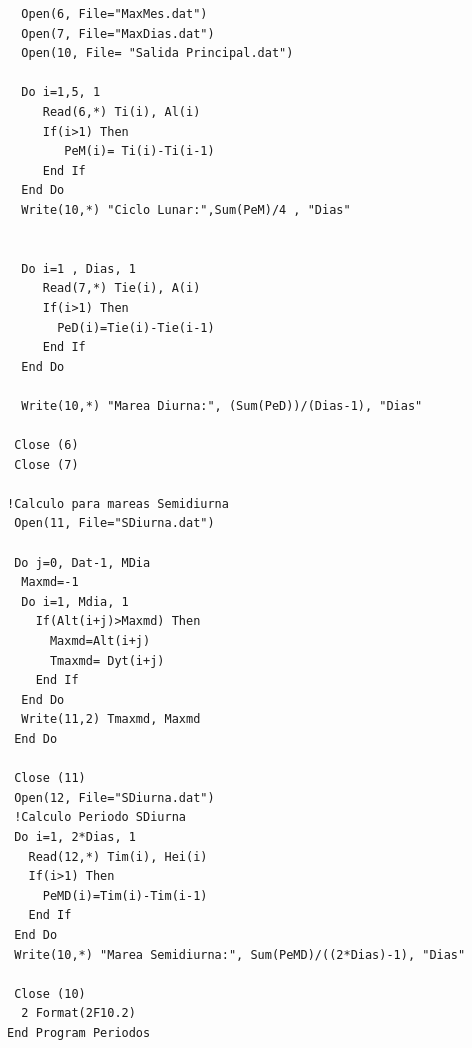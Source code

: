 \documentclass[12pt]{article}
\begin{document}
\begin{verbatim}
  Open(6, File="MaxMes.dat")
  Open(7, File="MaxDias.dat")
  Open(10, File= "Salida Principal.dat")
  
  Do i=1,5, 1 
     Read(6,*) Ti(i), Al(i)
     If(i>1) Then
        PeM(i)= Ti(i)-Ti(i-1)	
     End If
  End Do
  Write(10,*) "Ciclo Lunar:",Sum(PeM)/4 , "Dias"


  Do i=1 , Dias, 1
     Read(7,*) Tie(i), A(i)
     If(i>1) Then
       PeD(i)=Tie(i)-Tie(i-1)
     End If
  End Do

  Write(10,*) "Marea Diurna:", (Sum(PeD))/(Dias-1), "Dias"

 Close (6)
 Close (7)

!Calculo para mareas Semidiurna
 Open(11, File="SDiurna.dat")
  
 Do j=0, Dat-1, MDia
  Maxmd=-1
  Do i=1, Mdia, 1
    If(Alt(i+j)>Maxmd) Then
      Maxmd=Alt(i+j)
      Tmaxmd= Dyt(i+j)
    End If
  End Do
  Write(11,2) Tmaxmd, Maxmd
 End Do

 Close (11)
 Open(12, File="SDiurna.dat")
 !Calculo Periodo SDiurna
 Do i=1, 2*Dias, 1
   Read(12,*) Tim(i), Hei(i)
   If(i>1) Then
     PeMD(i)=Tim(i)-Tim(i-1)
   End If
 End Do
 Write(10,*) "Marea Semidiurna:", Sum(PeMD)/((2*Dias)-1), "Dias"
 
 Close (10)
  2 Format(2F10.2)
End Program Periodos
\end{verbatim}
\pagebreak
\end{document}
